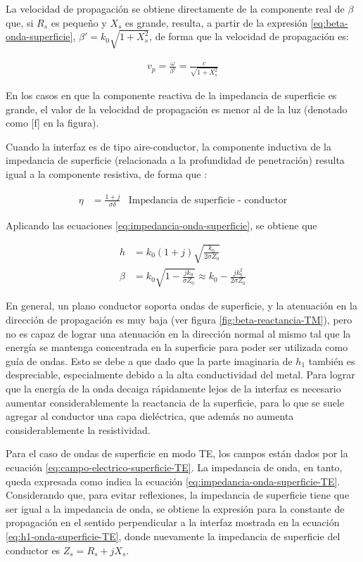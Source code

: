 La velocidad de propagación se obtiene directamente de la componente real de $\beta$ que, si $R_s$ es pequeño y $X_s$ es grande, resulta, a partir de la expresión \ref{eq:beta-onda-superficie}, $\beta' = k_0 \sqrt{1+X_s^2}$, de forma que la velocidad de propagación es:

\begin{align}
	v_p = \frac{\omega}{\beta'} = \frac{c}{\sqrt{1+X_s^2}}
\end{align}

En los casos en que la componente reactiva de la impedancia de superficie es grande, el valor de la velocidad de propagación es menor al de la luz (denotado como [f] en la figura).


Cuando la interfaz es de tipo aire-conductor, la componente inductiva de la impedancia de superficie (relacionada a la profundidad de penetración) resulta igual a la componente resistiva, de forma que \cite{Fernandez:Electromag}:

\begin{align}
	\eta &= \frac{1+j}{\sigma \delta} &\text{Impedancia de superficie - conductor}
\end{align}
 
Aplicando las ecuaciones \ref{eq:impedancia-onda-superficie}, se obtiene que

\begin{align}
	h &= k_0 (1+j) \sqrt{\frac{k_0}{2 \sigma Z_0}} \\
	\beta &= k_0 \sqrt{1-\frac{j k_0}{\sigma Z_0}} \approx k_0 - \frac{j k_0^2}{2 \sigma Z_0}
\end{align}

En general, un plano conductor soporta ondas de superficie, y la atenuación en la dirección de propagación es muy baja (ver figura \ref{fig:beta-reactancia-TM}), pero no es capaz de lograr una atenuación en la dirección normal al mismo tal que la energía se mantenga concentrada en la superficie para poder ser utilizada como guía de ondas. Esto se debe a que dado que la parte imaginaria de $h_1$ también es despreciable, especialmente debido a la alta conductividad del metal. Para lograr que la energía de la onda decaiga rápidamente lejos de la interfaz es necesario aumentar considerablemente la reactancia de la superficie, para lo que se suele agregar al conductor una capa dieléctrica, que además no aumenta considerablemente la resistividad.

Para el caso de ondas de superficie en modo TE, los campos están dados por la ecuación \ref{eq:campo-electrico-superficie-TE}. La impedancia de onda, en tanto, queda expresada como indica la ecuación \ref{eq:impedancia-onda-superficie-TE}. Considerando que, para evitar reflexiones, la impedancia de superficie tiene que ser igual a la impedancia de onda, se obtiene la expresión para la constante de propagación en el sentido perpendicular a la interfaz mostrada en la ecuación \ref{eq:h1-onda-superficie-TE}, donde nuevamente la impedancia de superficie del conductor es $Z_s = R_s +jX_s$.

